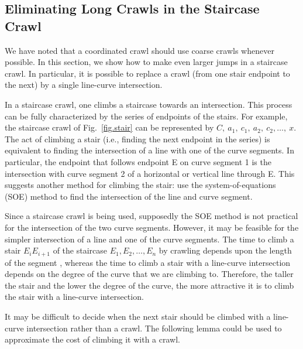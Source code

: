\subsection{Eliminating Long Crawls in the Staircase Crawl}
\label{sub-linecurve}

We have noted that a coordinated crawl should use coarse crawls whenever possible.
In this section, we show how to make even larger jumps in a staircase crawl.
In particular, it is possible to replace a crawl (from one stair endpoint to the next)
by a single line-curve intersection.

In a staircase crawl, one climbs a staircase towards an intersection.
This process can be fully characterized by the series of endpoints of the stairs.
For example, the staircase crawl of Fig.~\ref{fig.stair} can be represented by 
$C,\ a_{1},\ c_{1},\ a_{2},\ c_{2}, \ldots,\ x$.
The act of climbing a stair (i.e., finding the next endpoint in the series)
is equivalent to finding the intersection of a line with one of the curve segments.
In particular, the endpoint that follows endpoint E on curve segment 1 is the intersection 
with curve segment 2 of a horizontal or vertical line through E.
This suggests another method for climbing the stair: use the system-of-equations (SOE)
method to find the intersection of the line and curve segment.

Since a staircase crawl is being used, supposedly the SOE method is not practical 
for the intersection of the two curve segments.
However, it may be feasible for the simpler intersection of a line and one of the curve segments.
The time to climb a stair $E_{i}E_{i+1}$ of the staircase $E_{1},E_{2},\ldots,E_{n}$
by crawling depends upon the length of the segment , 
whereas the time to climb a stair with a line-curve intersection depends on the degree 
of the curve that we are climbing to.
Therefore, the taller the stair and the lower the degree of the curve,
the more attractive it is to climb the stair with a line-curve intersection.

It may be difficult to decide when the next stair should be climbed with a line-curve intersection
rather than a crawl.
The following lemma could be used to approximate the cost of climbing it with a crawl.

